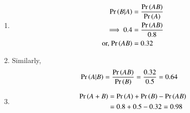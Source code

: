 \begin{enumerate}
    \item 
	    \begin{align}
        \Pr\left(B|A\right)&= \frac{\Pr\left(AB\right)}{\Pr\left(A\right)}\\
\implies       0.4 &= \frac{\Pr\left(AB\right)}{0.8}\\
		    \text{or, }      {\ensuremath{\Pr\left(AB\right)}} &= {0.32}
    \end{align}
    \item Similarly,
    \begin{align}
    \Pr\left(A|B\right) &= \frac{\Pr\left(AB\right)}{\Pr\left(B\right)}
= \frac{0.32}{0.5}
     = {0.64}
     \end{align}
    \item
    \begin{align}
    \Pr\left(A+B\right) &= \Pr\left(A\right) + \Pr\left(B\right) - \Pr\left(AB\right)\\
      &= 0.8 + 0.5 - 0.32
     = {0.98}
     \end{align}
\end{enumerate}

